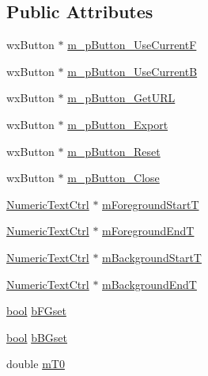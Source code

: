 \subsection*{Public Attributes}
\begin{DoxyCompactItemize}
\item 
wx\+Button $\ast$ \hyperlink{class_contrast_dialog_ac97972626256ba24449531dc2ef5a05e}{m\+\_\+p\+Button\+\_\+\+Use\+CurrentF}
\item 
wx\+Button $\ast$ \hyperlink{class_contrast_dialog_a2c0d1b5cdeff1a4a22b980a30ed5ae37}{m\+\_\+p\+Button\+\_\+\+Use\+CurrentB}
\item 
wx\+Button $\ast$ \hyperlink{class_contrast_dialog_afbe34d1ad293853e276cf01fc918668e}{m\+\_\+p\+Button\+\_\+\+Get\+U\+RL}
\item 
wx\+Button $\ast$ \hyperlink{class_contrast_dialog_a9a2bb011b64fec909dec844bdb60916d}{m\+\_\+p\+Button\+\_\+\+Export}
\item 
wx\+Button $\ast$ \hyperlink{class_contrast_dialog_aadc6db15b135686c49997087e177fdcb}{m\+\_\+p\+Button\+\_\+\+Reset}
\item 
wx\+Button $\ast$ \hyperlink{class_contrast_dialog_a0474b1f29e9c970708fd6ff2423199f8}{m\+\_\+p\+Button\+\_\+\+Close}
\item 
\hyperlink{class_numeric_text_ctrl}{Numeric\+Text\+Ctrl} $\ast$ \hyperlink{class_contrast_dialog_a6d6e56d0208124b8c18783c21a85d415}{m\+Foreground\+StartT}
\item 
\hyperlink{class_numeric_text_ctrl}{Numeric\+Text\+Ctrl} $\ast$ \hyperlink{class_contrast_dialog_ac9be2dbffc053e7b73384f4740e54a1e}{m\+Foreground\+EndT}
\item 
\hyperlink{class_numeric_text_ctrl}{Numeric\+Text\+Ctrl} $\ast$ \hyperlink{class_contrast_dialog_a03ece4032903821b920842734d148a61}{m\+Background\+StartT}
\item 
\hyperlink{class_numeric_text_ctrl}{Numeric\+Text\+Ctrl} $\ast$ \hyperlink{class_contrast_dialog_a1b0b0cae075a2543856a2ea245610531}{m\+Background\+EndT}
\item 
\hyperlink{mac_2config_2i386_2lib-src_2libsoxr_2soxr-config_8h_abb452686968e48b67397da5f97445f5b}{bool} \hyperlink{class_contrast_dialog_a0e91746f09808acf97500681f8875611}{b\+F\+Gset}
\item 
\hyperlink{mac_2config_2i386_2lib-src_2libsoxr_2soxr-config_8h_abb452686968e48b67397da5f97445f5b}{bool} \hyperlink{class_contrast_dialog_aef59715818b2e9154abf4dc29dfef32e}{b\+B\+Gset}
\item 
double \hyperlink{class_contrast_dialog_a0f1280e4caa1bbb21b999e53f56715df}{m\+T0}

\end{DoxyCompactItemize}
